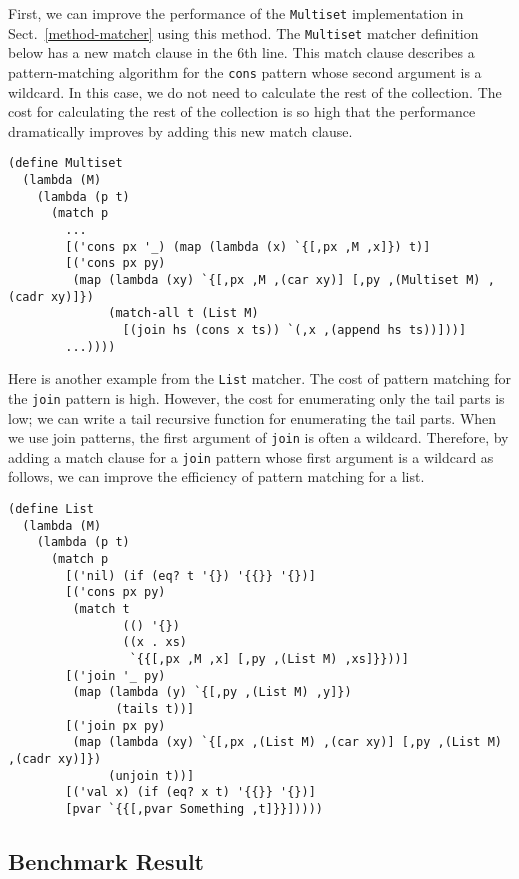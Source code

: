 \documentclass[acmlarge]{acmart}
\newcommand{\todo}[1]{\textcolor{red}{(TODO: #1)}}
\begin{document}
First, we can improve the performance of the \lstinline{Multiset} implementation in Sect.~\ref{method-matcher} using this method.
The \lstinline{Multiset} matcher definition below has a new match clause in the 6th line.
This match clause describes a pattern-matching algorithm for the \lstinline{cons} pattern whose second argument is a wildcard.
In this case, we do not need to calculate the rest of the collection.
The cost for calculating the rest of the collection is so high that the performance dramatically improves by adding this new match clause.

\begin{lstlisting}[language=egison]
(define Multiset
  (lambda (M)
    (lambda (p t)
      (match p
        ...
        [('cons px '_) (map (lambda (x) `{[,px ,M ,x]}) t)]
        [('cons px py)
         (map (lambda (xy) `{[,px ,M ,(car xy)] [,py ,(Multiset M) ,(cadr xy)]})
              (match-all t (List M)
                [(join hs (cons x ts)) `(,x ,(append hs ts))]))]
        ...))))
\end{lstlisting}

Here is another example from the \lstinline{List} matcher.
The cost of pattern matching for the \lstinline{join} pattern is high.
However, the cost for enumerating only the tail parts is low; we can write a tail recursive function for enumerating the tail parts.
When we use join patterns, the first argument of \lstinline{join} is often a wildcard.
Therefore, by adding a match clause for a \lstinline{join} pattern whose first argument is a wildcard as follows, we can improve the efficiency of pattern matching for a list.

\begin{lstlisting}[language=egison]
(define List
  (lambda (M)
    (lambda (p t)
      (match p
        [('nil) (if (eq? t '{}) '{{}} '{})]
        [('cons px py)
         (match t
                (() '{})
                ((x . xs)
                 `{{[,px ,M ,x] [,py ,(List M) ,xs]}}))]
        [('join '_ py)
         (map (lambda (y) `{[,py ,(List M) ,y]})
               (tails t))]
        [('join px py)
         (map (lambda (xy) `{[,px ,(List M) ,(car xy)] [,py ,(List M) ,(cadr xy)]})
              (unjoin t))]
        [('val x) (if (eq? x t) '{{}} '{})]
        [pvar `{{[,pvar Something ,t]}}]))))
\end{lstlisting}

\subsection{Benchmark Result}\label{benchmark-result}
\end{document}
